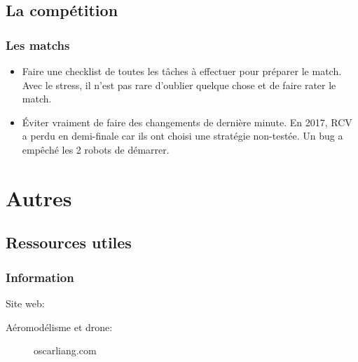 \documentclass[a4paper, 11pt]{report}
\begin{document}
\chapter{La compétition}

\section{Les matchs}
\begin{itemize}
\item Faire une checklist de toutes les tâches à effectuer pour préparer le match. Avec le stress, il n’est pas rare d’oublier quelque chose et de faire rater le match.
\item Éviter vraiment de faire des changements de dernière minute. En 2017, RCV a perdu en demi-finale car ils ont choisi une stratégie non-testée. Un bug a empêché les 2 robots de démarrer.
\end{itemize}

\part{Autres}

\chapter{Ressources utiles}

\section{Information}
Site web:
\begin{description}
\item[Aéromodélisme et drone:] oscarliang.com
\end{description}
\end{document}

